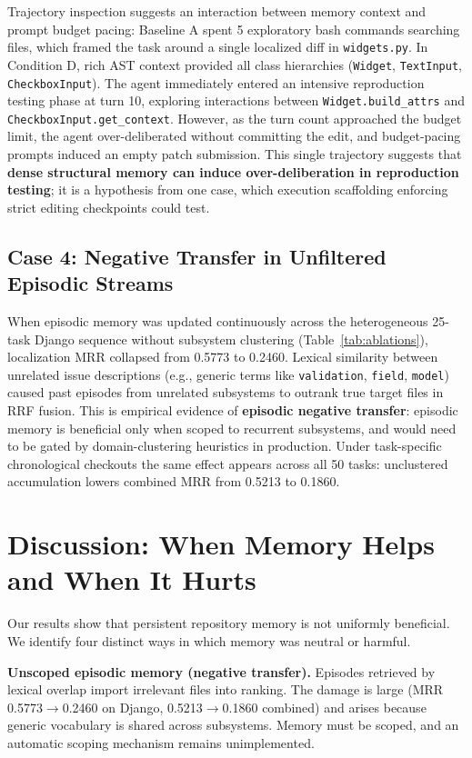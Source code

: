 \documentclass[conference]{IEEEtran}
\begin{document}
Trajectory inspection suggests an interaction between memory context and prompt budget pacing: Baseline A spent 5 exploratory bash commands searching files, which framed the task around a single localized diff in \texttt{widgets.py}. In Condition D, rich AST context provided all class hierarchies (\texttt{Widget}, \texttt{TextInput}, \texttt{CheckboxInput}). The agent immediately entered an intensive reproduction testing phase at turn 10, exploring interactions between \texttt{Widget.build\_attrs} and \texttt{CheckboxInput.get\_context}. However, as the turn count approached the budget limit, the agent over-deliberated without committing the edit, and budget-pacing prompts induced an empty patch submission. This single trajectory suggests that \textbf{dense structural memory can induce over-deliberation in reproduction testing}; it is a hypothesis from one case, which execution scaffolding enforcing strict editing checkpoints could test.

\subsection{Case 4: Negative Transfer in Unfiltered Episodic Streams}
When episodic memory was updated continuously across the heterogeneous 25-task Django sequence without subsystem clustering (Table~\ref{tab:ablations}), localization MRR collapsed from 0.5773 to 0.2460. Lexical similarity between unrelated issue descriptions (e.g., generic terms like \texttt{validation}, \texttt{field}, \texttt{model}) caused past episodes from unrelated subsystems to outrank true target files in RRF fusion. This is empirical evidence of \textbf{episodic negative transfer}: episodic memory is beneficial only when scoped to recurrent subsystems, and would need to be gated by domain-clustering heuristics in production. Under task-specific chronological checkouts the same effect appears across all 50 tasks: unclustered accumulation lowers combined MRR from 0.5213 to 0.1860.

\section{Discussion: When Memory Helps and When It Hurts}
Our results show that persistent repository memory is not uniformly beneficial. We identify four distinct ways in which memory was neutral or harmful.

\textbf{Unscoped episodic memory (negative transfer).} Episodes retrieved by lexical overlap import irrelevant files into ranking. The damage is large (MRR 0.5773$\to$0.2460 on Django, 0.5213$\to$0.1860 combined) and arises because generic vocabulary is shared across subsystems. Memory must be scoped, and an automatic scoping mechanism remains unimplemented.
\end{document}
